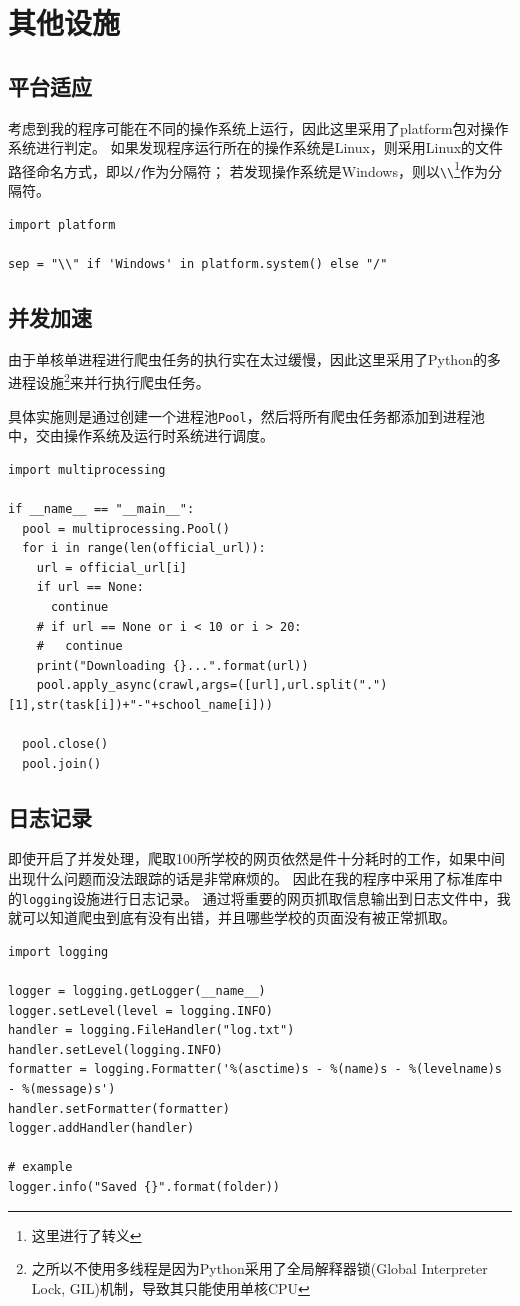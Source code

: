 \documentclass[logo,reportComp]{thesis}
\begin{document}
\section{其他设施}
\subsection{平台适应}
考虑到我的程序可能在不同的操作系统上运行，因此这里采用了platform包对操作系统进行判定。
如果发现程序运行所在的操作系统是Linux，则采用Linux的文件路径命名方式，即以\verb'/'作为分隔符；
若发现操作系统是Windows，则以\verb'\\'\footnote{这里进行了转义}作为分隔符。
\begin{lstlisting}
import platform

sep = "\\" if 'Windows' in platform.system() else "/"
\end{lstlisting}

\subsection{并发加速}
由于单核单进程进行爬虫任务的执行实在太过缓慢，因此这里采用了Python的多进程设施\footnote{之所以不使用多线程是因为Python采用了全局解释器锁(Global Interpreter Lock, GIL)机制，导致其只能使用单核CPU}来并行执行爬虫任务。

具体实施则是通过创建一个进程池\verb'Pool'，然后将所有爬虫任务都添加到进程池中，交由操作系统及运行时系统进行调度。
\begin{lstlisting}
import multiprocessing

if __name__ == "__main__":
  pool = multiprocessing.Pool()
  for i in range(len(official_url)):
    url = official_url[i]
    if url == None:
      continue
    # if url == None or i < 10 or i > 20:
    #   continue
    print("Downloading {}...".format(url))
    pool.apply_async(crawl,args=([url],url.split(".")[1],str(task[i])+"-"+school_name[i]))

  pool.close()
  pool.join()
\end{lstlisting}

\subsection{日志记录}
即使开启了并发处理，爬取100所学校的网页依然是件十分耗时的工作，如果中间出现什么问题而没法跟踪的话是非常麻烦的。
因此在我的程序中采用了标准库中的\verb'logging'设施进行日志记录。
通过将重要的网页抓取信息输出到日志文件中，我就可以知道爬虫到底有没有出错，并且哪些学校的页面没有被正常抓取。
\begin{lstlisting}
import logging

logger = logging.getLogger(__name__)
logger.setLevel(level = logging.INFO)
handler = logging.FileHandler("log.txt")
handler.setLevel(logging.INFO)
formatter = logging.Formatter('%(asctime)s - %(name)s - %(levelname)s - %(message)s')
handler.setFormatter(formatter)
logger.addHandler(handler)

# example
logger.info("Saved {}".format(folder))
\end{lstlisting}
\end{document}
